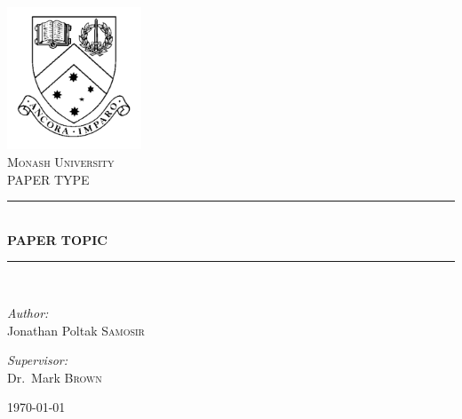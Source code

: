 \begin{titlepage}
\begin{center}


\includegraphics[width=0.3\textwidth]{img/MonashCrest.pdf}~\\[1cm]

\textsc{\LARGE Monash University}\\[1.5cm]

\textsc{\Large PAPER TYPE}\\[0.5cm]         %

\rule{\linewidth}{0.5mm} \\[0.4cm]
{ \huge \bfseries PAPER TOPIC \\[0.4cm] }   %

\rule{\linewidth}{0.5mm} \\[1.5cm]

\noindent
\begin{minipage}{0.4\textwidth}
\begin{flushleft} \large
\emph{Author:}\\
Jonathan Poltak \textsc{Samosir}
\end{flushleft}
\end{minipage}%
\begin{minipage}{0.4\textwidth}
\begin{flushright} \large
\emph{Supervisor:} \\
Dr.~Mark \textsc{Brown}
\end{flushright}
\end{minipage}

\vfill

{\large \today}

\end{center}
\end{titlepage}
